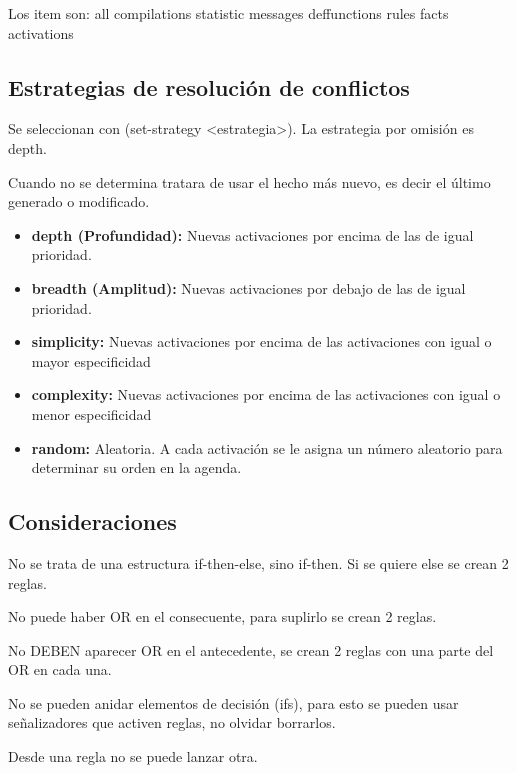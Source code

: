\documentclass[12pt, twoside, openright]{report} %
\begin{document}
Los item son: all compilations statistic messages deffunctions rules facts activations

\subsection{Estrategias de resolución de conflictos}
Se seleccionan con (set-strategy <estrategia>). La estrategia por omisión es depth.

Cuando no se determina tratara de usar el hecho más nuevo, es decir el último generado o modificado.

\begin{itemize}
	\item \textbf{depth (Profundidad):} Nuevas activaciones por encima de las de igual prioridad.
	\item \textbf{breadth (Amplitud):} Nuevas activaciones por debajo de las de igual prioridad.
	\item \textbf{simplicity:} Nuevas activaciones por encima de las activaciones con igual o mayor especificidad
	\item \textbf{complexity:} Nuevas activaciones por encima de las activaciones con igual o menor especificidad
	\item \textbf{random:} Aleatoria. A cada activación se le asigna un número aleatorio para determinar su orden en la agenda.
\end{itemize}

\subsection{Consideraciones}
No se trata de una estructura if-then-else, sino if-then. Si se quiere else se crean 2 reglas.

No puede haber OR en el consecuente, para suplirlo se crean 2 reglas.

No DEBEN aparecer OR en el antecedente, se crean 2 reglas con una parte del OR en cada una.

No se pueden anidar elementos de decisión (ifs), para esto se pueden usar señalizadores que activen reglas, no olvidar borrarlos.

Desde una regla no se puede lanzar otra.
\end{document}
